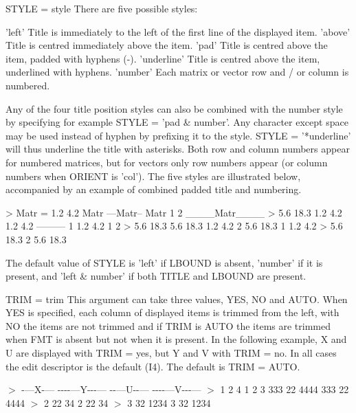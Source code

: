 S\+T\+Y\+LE = style There are five possible styles\+: \begin{DoxyVerb}      'left'       Title is immediately to the left of the first line of the displayed item.
      'above'      Title is centred immediately above the item.
      'pad'        Title is centred above the item, padded with hyphens (-).
      'underline'  Title is centred above the item, underlined with hyphens.
      'number'     Each matrix or vector row and / or column is numbered.

  Any of the four title position styles can also be combined with the number style by
  specifying for example STYLE = 'pad & number'. Any character except space may be used
  instead of hyphen by prefixing it to the style. STYLE = '*underline' will thus underline the
  title with asterisks. Both row and column numbers appear for numbered matrices, but for
  vectors only row numbers appear (or column numbers when ORIENT is 'col'). The five styles
  are illustrated below, accompanied by an example of combined padded title and numbering.

    > Matr = 1.2   4.2       Matr      ---Matr--       Matr          1     2     ____Matr____
    >        5.6  18.3    1.2   4.2    1.2   4.2    ---------    1  1.2   4.2        1     2
    >                     5.6  18.3    5.6  18.3    1.2   4.2    2  5.6  18.3    1  1.2   4.2
    >                                               5.6  18.3                    2  5.6  18.3

  The default value of STYLE is 'left' if LBOUND is absent, 'number' if it is present, and
  'left & number' if both TITLE and LBOUND are present.
\end{DoxyVerb}


T\+R\+IM = trim This argument can take three values, \textquotesingle{}Y\+ES\textquotesingle{}, \textquotesingle{}NO\textquotesingle{} and \textquotesingle{}A\+U\+TO\textquotesingle{}. When Y\+ES is specified, each column of displayed items is trimmed from the left, with \textquotesingle{}NO\textquotesingle{} the items are not trimmed and if T\+R\+IM is \textquotesingle{}A\+U\+TO\textquotesingle{} the items are trimmed when F\+MT is absent but not when it is present. In the following example, X and U are displayed with T\+R\+IM = \textquotesingle{}yes\textquotesingle{}, but Y and V with T\+R\+IM = \textquotesingle{}no\textquotesingle{}. In all cases the edit descriptor is the default (I4). The default is T\+R\+IM = \textquotesingle{}A\+U\+TO\textquotesingle{}.

$>$ -\/---X-\/--- -\/-\/-\/-\/---Y-\/-\/-\/--- -\/-\/---U-\/-\/--- -\/-\/-\/-\/---V-\/-\/-\/--- $>$ 1 2 4 1 2 3 333 22 4444 333 22 4444 $>$ 2 22 34 2 22 34 $>$ 3 32 1234 3 32 1234


